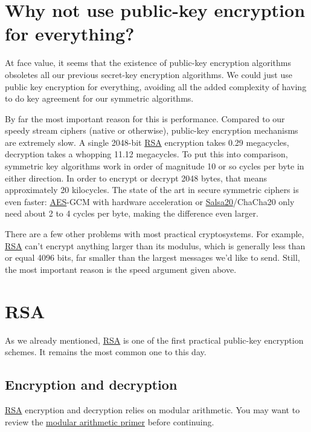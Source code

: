 \documentclass[11pt,ebook,table,dvipsnames]{memoir}
\begin{document}
\section{Why not use public-key encryption for everything?}
\label{sec-2-5-2}

At face value, it seems that the existence of
\gls{public-key encryption} algorithms obsoletes all our previous
\gls{secret-key encryption} algorithms. We could just use public
key encryption for everything, avoiding all the added complexity
of having to do key agreement for our symmetric algorithms.

By far the most important reason for this is performance. Compared to
our speedy stream ciphers (native or otherwise), public-key encryption
mechanisms are extremely slow. A single 2048-bit \hyperref[RSA]{RSA} encryption takes
0.29 megacycles, decryption takes a whopping 11.12 megacycles.
\cite{cryptopp:bench} To put this into comparison, symmetric key
algorithms work in order of magnitude 10 or so cycles per byte in
either direction. In order to encrypt or decrypt 2048 bytes, that
means approximately 20 kilocycles. The state of the art in secure
symmetric ciphers is even faster: \hyperref[AES]{AES}-GCM with hardware acceleration
or \hyperref[Salsa20]{Salsa20}/ChaCha20 only need about 2 to 4 cycles per byte, making the
difference even larger.

There are a few other problems with most practical cryptosystems. For
example, \hyperref[RSA]{RSA} can't encrypt anything larger than its modulus, which is
generally less than or equal 4096 bits, far smaller than the largest
messages we'd like to send. Still, the most important reason is the
speed argument given above.
\section{\label{RSA}RSA}
\label{sec-2-5-3}

As we already mentioned, \hyperref[RSA]{RSA} is one of the first practical
\gls{public-key encryption} schemes. It remains the most common one
to this day.

\subsection{Encryption and decryption}
\label{sec-2-5-3-1}

\hyperref[RSA]{RSA} encryption and decryption relies on modular arithmetic. You may
want to review the \hyperref[Modular-arithmetic]{modular arithmetic primer} before continuing.
\end{document}
